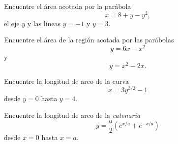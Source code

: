 
	\begin{resuelto} %
		Encuentre el área acotada por la parábola \[ x=8+y-y^2 , \] el eje $ y $ y las líneas $ y=-1 $ y $ y=3. $
	\end{resuelto}



	\begin{resuelto}

		Encuentre el área de la región acotada por las parábolas \[ y= 6x-x^2 \] y \[ y=x^2-2x. \]
	\end{resuelto}



	\begin{resuelto}
		Encuentre la longitud de arco de la curva \[ x=3y^{3/2}-1 \] desde $ y=0 $ hasta $ y=4 .$
	\end{resuelto}



	\begin{resuelto}
		Encuentre la longitud de arco de la \emph{catenaria} \[ y=\dfrac{a}{2}\left(e^{x/a} + e^{-x/a}\right) \] desde $ x=0 $ hasta $ x=a $.
	\end{resuelto}
